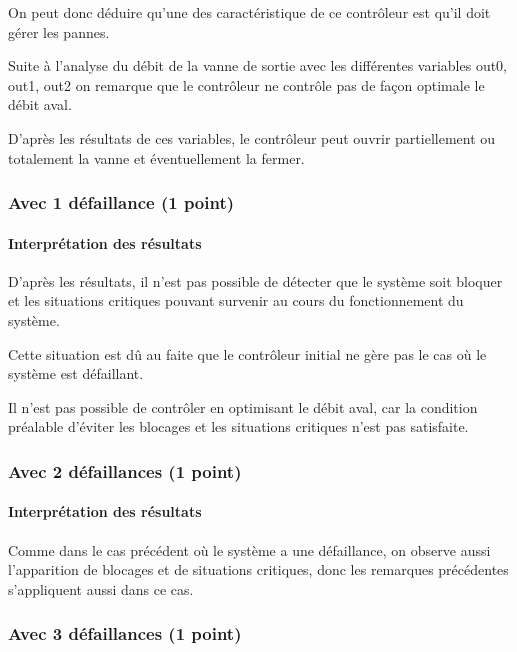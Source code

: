 \documentclass[a4paper]{book}
\begin{document}
On peut donc déduire qu'une des caractéristique de ce contrôleur est qu'il doit gérer les pannes.

Suite à l'analyse du débit de la vanne de sortie avec les différentes variables out0, out1, out2 on remarque que le contrôleur ne contrôle pas de façon optimale le débit aval.

D'après les résultats de ces variables, le contrôleur peut ouvrir partiellement ou totalement la vanne et éventuellement la fermer.
\subsubsection{Avec 1 défaillance (1 point)}





\paragraph{Interprétation des résultats}
D'après les résultats, il n'est pas possible de détecter que le système soit bloquer et les situations critiques pouvant survenir au cours du fonctionnement du système.

Cette situation est dû au faite que le contrôleur initial ne gère pas le cas où le système est défaillant.

Il n'est pas possible de contrôler en optimisant le débit aval, car la condition préalable d'éviter les blocages et les situations critiques n'est pas satisfaite.

\subsubsection{Avec 2 défaillances (1 point)}





\paragraph{Interprétation des résultats}
Comme dans le cas précédent où le système a une défaillance, on observe aussi l'apparition de blocages et de situations critiques, donc les remarques précédentes s'appliquent aussi dans ce cas.

\subsubsection{Avec 3 défaillances (1 point)}





\end{document}
